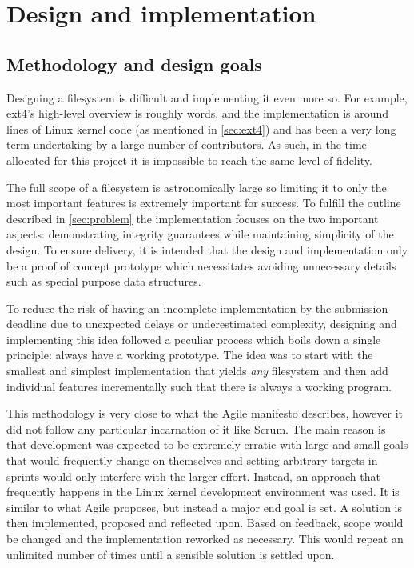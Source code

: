 \chapter{Design and implementation}
    \label{ch:design}

    \section{Methodology and design goals}
        \label{sec:methodology}

        Designing a filesystem is difficult and implementing it even more so.
        For example, ext4's high-level overview \cite{ext4_docs} is roughly
         words, and the implementation is around
         lines of Linux kernel code (as mentioned in
        \autoref{sec:ext4}) and has been a very long term undertaking by a
        large number of contributors. As such, in the time allocated for this
        project it is impossible to reach the same level of fidelity.

        The full scope of a filesystem is astronomically large so limiting it
        to only the most important features is extremely important for success.
        To fulfill the outline described in \autoref{sec:problem} the
        implementation focuses on the two important aspects: demonstrating
        integrity guarantees while maintaining simplicity of the design. To
        ensure delivery, it is intended that the design and implementation only
        be a proof of concept prototype which necessitates avoiding unnecessary details such
        as special purpose data structures.

        To reduce the risk of having an incomplete implementation by the
        submission deadline due to unexpected delays or underestimated
        complexity, designing and implementing this idea followed a peculiar
        process which boils down a single principle: always have a working
        prototype. The idea was to start with the smallest and simplest
        implementation that yields \textit{any} filesystem and then add
        individual features incrementally such that there is always a working
        program.

        This methodology is very close to what the Agile manifesto \cite{agile}
        describes, however it did not follow any particular incarnation of it
        like Scrum. The main reason is that development was expected to be
        extremely erratic with large and small goals that would frequently
        change on themselves and setting arbitrary targets in sprints would
        only interfere with the larger effort. Instead, an approach that
        frequently happens in the Linux kernel development environment
        \cite{Linux_howto} was used. It is similar to what Agile proposes, but
        instead a major end goal is set. A solution is then implemented,
        proposed and reflected upon. Based on feedback, scope would be changed and
        the implementation reworked as necessary. This would repeat an unlimited
        number of times until a sensible solution is settled upon.


